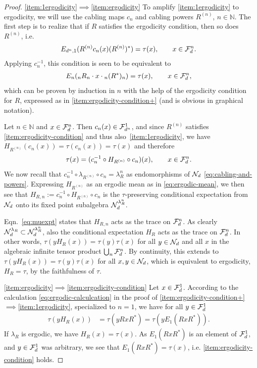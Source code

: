 \documentclass[12pt,a4paper]{amsart}
\numberwithin{equation}{section}
\theoremstyle{remark}
\newcommand{\Nl}{\mathbb{N}}
\newcommand{\la}{\lambda}
\begin{document}
\begin{proof}
	\medskip
	
	\ref{item:1ergodicity}$\implies$\ref{item:ergodicity} To amplify \ref{item:1ergodicity} to ergodicity, we will use the cabling maps $c_n$ and cabling powers $R^{(n)}$, $n\in\Nl$. The first step is to realize that if $R$ satisfies the ergodicity condition, then so does $R^{(n)}$, i.e.
	\begin{align*}
		E_{d^n,1}(R^{(n)}c_n(x)(R^{(n)})^*)=\tau(x)
		,\qquad x\in\mathcal{F}_d^n.
	\end{align*}
    Applying $c_n^{-1}$, this condition is seen to be equivalent to
    \begin{align*}
	 E_n({}_nR_n\cdot x\cdot{}_n(R^*)_n)=\tau(x),\qquad x\in\mathcal{F}_d^n,
	\end{align*}
    which can be proven by induction in $n$ with the help of the ergodicity condition for $R$, expressed as in \ref{item:ergodicity-condition+} (and is obvious in graphical notation).
	
	
	Let $n\in\Nl$ and $x\in\mathcal{F}_d^n$. Then $c_n(x)\in\mathcal{F}_{d^n}^1$, and since $R^{(n)}$ satisfies \ref{item:ergodicity-condition} and thus also~\ref{item:1ergodicity}, we have $H_{R^{(n)}}(c_n(x))=\tau(c_n(x))=\tau(x)$ and  therefore
    \begin{align}\label{eq:muexpt}
     \tau(x) = (c_n^{-1}\circ H_{R^{(n)}}\circ c_n)(x), \qquad x\in\mathcal{F}_d^n.
    \end{align}
    We now recall that $c_n^{-1}\circ\la_{R^{(n)}}\circ c_n=\la_R^n$ as endomorphisms of $\mathcal{N}_d$ \eqref{eq:cabling-and-powers}. Expressing $H_{R^{(n)}}$ as an ergodic mean as in \eqref{eq:ergodic-mean}, we then see that $H_{R,n}:=c_n^{-1}\circ H_{R^{(n)}}\circ c_n$ is the $\tau$-preserving conditional expectation from $\mathcal{N}_d$ onto its fixed point subalgebra $\CN_d^{\la_R^n}$.
    
	Eqn.~\eqref{eq:muexpt} states that $H_{R,n}$ acts as the trace on $\mathcal{F}_d^n$. As clearly $\CN_d^{\la_R}\subset\CN_d^{\la_R^n}$, also the conditional expectation $H_R$ acts as the trace on $\mathcal{F}_d^n$. In other words, $\tau(yH_R(x))=\tau(y)\tau(x)$ for all $y\in\mathcal{N}_d$ and all $x$ in the algebraic infinite tensor product $\bigcup_n\mathcal{F}_d^n$. By continuity, this extends to $\tau(yH_R(x))=\tau(y)\tau(x)$ for all $x,y\in\mathcal{N}_d$, which is equivalent to ergodicity, $H_R=\tau$, by the faithfulness of $\tau$.
	
	\ref{item:ergodicity}$\implies$\ref{item:ergodicity-condition} 
	Let $x\in\mathcal{F}_d^1$. According to the calculation \eqref{eq:ergodic-calculcation} in the proof of \ref{item:ergodicity-condition+}$\implies$\ref{item:1ergodicity}, specialized to $n=1$, we have for all $y\in\mathcal{F}_d^1$
    \begin{align*}
		\tau(yH_R(x))
        &=
        \tau(yRxR^*)
        =
        \tau(yE_1(RxR^*)).
    \end{align*}
    If $\la_R$ is ergodic, we have $H_R(x)=\tau(x)$. As $E_1(RxR^*)$ is an element of $\mathcal{F}_d^1$, and $y\in\mathcal{F}_d^1$ was arbitrary, we see that $E_1(RxR^*)=\tau(x)$, i.e. \ref{item:ergodicity-condition} holds.       
\end{proof}
\end{document}
